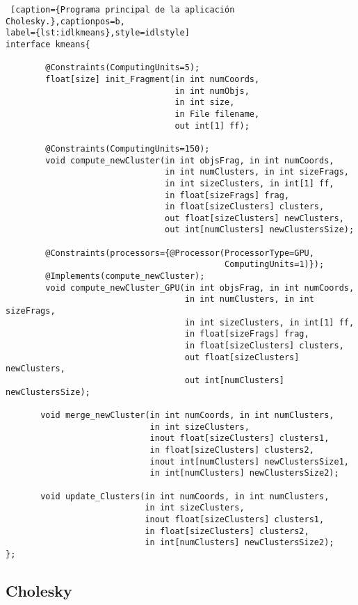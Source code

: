 \begin{minipage}{\linewidth}
\begin{lstlisting} [caption={Programa principal de la aplicación Cholesky.},captionpos=b, 
label={lst:idlkmeans},style=idlstyle]
interface kmeans{

        @Constraints(ComputingUnits=5);
        float[size] init_Fragment(in int numCoords,
								  in int numObjs,
								  in int size,
								  in File filename,
								  out int[1] ff);

        @Constraints(ComputingUnits=150);
        void compute_newCluster(in int objsFrag, in int numCoords, 
								in int numClusters, in int sizeFrags, 
								in int sizeClusters, in int[1] ff, 
								in float[sizeFrags] frag, 
								in float[sizeClusters] clusters, 
								out float[sizeClusters] newClusters, 
								out int[numClusters] newClustersSize);

        @Constraints(processors={@Processor(ProcessorType=GPU, 
											ComputingUnits=1)});
        @Implements(compute_newCluster);
        void compute_newCluster_GPU(in int objsFrag, in int numCoords,
									in int numClusters, in int sizeFrags,
									in int sizeClusters, in int[1] ff,
									in float[sizeFrags] frag,
									in float[sizeClusters] clusters,
									out float[sizeClusters] newClusters, 
									out int[numClusters] newClustersSize);

       void merge_newCluster(in int numCoords, in int numClusters, 
							 in int sizeClusters, 
							 inout float[sizeClusters] clusters1, 
							 in float[sizeClusters] clusters2,
							 inout int[numClusters] newClustersSize1, 
							 in int[numClusters] newClustersSize2);

       void update_Clusters(in int numCoords, in int numClusters,
							in int sizeClusters, 
							inout float[sizeClusters] clusters1,
							in float[sizeClusters] clusters2,
							in int[numClusters] newClustersSize2);
};

\end{lstlisting}
\end{minipage}

\newpage

\subsection{Cholesky}
\label{sec:codigocholesky}

